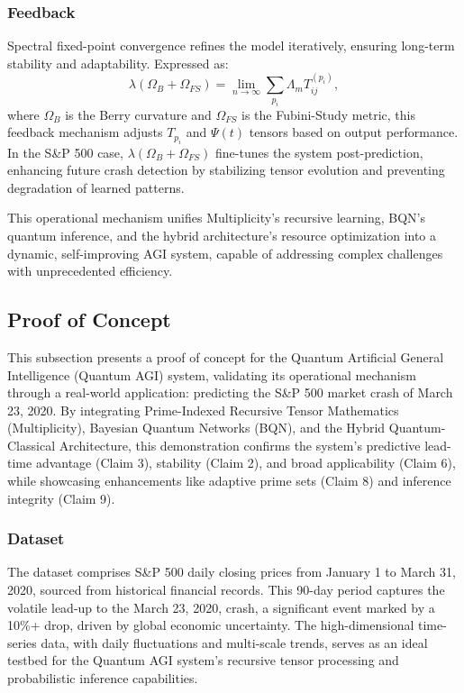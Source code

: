 \documentclass[12pt]{article}
\begin{document}
\subsubsection{Feedback}
Spectral fixed-point convergence refines the model iteratively, ensuring long-term stability and adaptability. Expressed as:
\begin{equation}
\lambda (\Omega_B + \Omega_{FS}) = \lim_{n \to \infty} \sum_{p_i} \Lambda_m T_{ij}^{(p_i)},
\end{equation}
where \( \Omega_B \) is the Berry curvature and \( \Omega_{FS} \) is the Fubini-Study metric, this feedback mechanism adjusts \( T_{p_i} \) and \( \Psi(t) \) tensors based on output performance. In the S\&P 500 case, \( \lambda (\Omega_B + \Omega_{FS}) \) fine-tunes the system post-prediction, enhancing future crash detection by stabilizing tensor evolution and preventing degradation of learned patterns.

This operational mechanism unifies Multiplicity’s recursive learning, BQN’s quantum inference, and the hybrid architecture’s resource optimization into a dynamic, self-improving AGI system, capable of addressing complex challenges with unprecedented efficiency.

\subsection{Proof of Concept}

This subsection presents a proof of concept for the Quantum Artificial General Intelligence (Quantum AGI) system, validating its operational mechanism through a real-world application: predicting the S\&P 500 market crash of March 23, 2020. By integrating Prime-Indexed Recursive Tensor Mathematics (Multiplicity), Bayesian Quantum Networks (BQN), and the Hybrid Quantum-Classical Architecture, this demonstration confirms the system’s predictive lead-time advantage (Claim 3), stability (Claim 2), and broad applicability (Claim 6), while showcasing enhancements like adaptive prime sets (Claim 8) and inference integrity (Claim 9).

\subsubsection{Dataset}
The dataset comprises S\&P 500 daily closing prices from January 1 to March 31, 2020, sourced from historical financial records. This 90-day period captures the volatile lead-up to the March 23, 2020, crash, a significant event marked by a 10\%+ drop, driven by global economic uncertainty. The high-dimensional time-series data, with daily fluctuations and multi-scale trends, serves as an ideal testbed for the Quantum AGI system’s recursive tensor processing and probabilistic inference capabilities.
\end{document}
